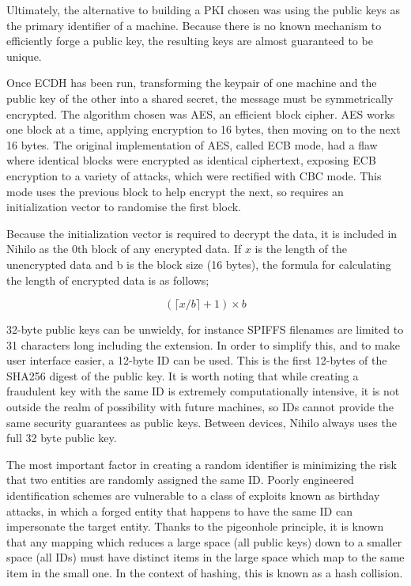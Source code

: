 \documentclass{article}
\begin{document}
Ultimately, the alternative to building a PKI chosen was using the public keys as the primary identifier of a machine. Because there is no known mechanism to efficiently forge a public key, the resulting keys are almost guaranteed to be unique.

Once ECDH has been run, transforming the keypair of one machine and the public key of the other into a shared secret, the message must be symmetrically encrypted. The algorithm chosen was AES\cite{aes}, an efficient block cipher. AES works one block at a time, applying encryption to 16 bytes, then moving on to the next 16 bytes. The original implementation of AES, called ECB mode, had a flaw where identical blocks were encrypted as identical ciphertext, exposing ECB encryption to a variety of attacks, which were rectified with CBC mode. This mode uses the previous block to help encrypt the next, so requires an initialization vector to randomise the first block.

Because the initialization vector is required to decrypt the data, it is included in Nihilo as the 0th block of any encrypted data. If \(x\) is the length of the unencrypted data and b is the block size (16 bytes), the formula for calculating the length of encrypted data is as follows;

\[ ( \lceil x/b \rceil +1) \times b\]

32-byte public keys can be unwieldy, for instance SPIFFS filenames are limited to 31 characters long including the extension. In order to simplify this, and to make user interface easier, a 12-byte ID can be used. This is the first 12-bytes of the SHA256 digest of the public key. It is worth noting that while creating a fraudulent key with the same ID is extremely computationally intensive, it is not outside the realm of possibility with future machines, so IDs cannot provide the same security guarantees as public keys. Between devices, Nihilo always uses the full 32 byte public key.

The most important factor in creating a random identifier is minimizing the risk that two entities are randomly assigned the same ID. Poorly engineered identification schemes are vulnerable to a class of exploits known as birthday attacks, in which a forged entity that happens to have the same ID can impersonate the target entity. Thanks to the pigeonhole principle\cite{pigeon}, it is known that any mapping which reduces a large space (all public keys) down to a smaller space (all IDs) must have distinct items in the large space which map to the same item in the small one. In the context of hashing, this is known as a hash collision.
\end{document}
